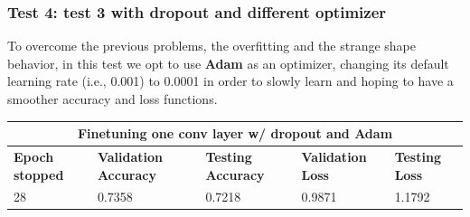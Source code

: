 \subsubsection{Test 4: test 3 with dropout and different optimizer}
To overcome the previous problems, the overfitting and the strange shape behavior, in this test we opt to use \textbf{Adam} as an optimizer, changing its default learning rate (i.e., 0.001) to 0.0001 in order to slowly learn and hoping to have a smoother accuracy and loss functions.

 
 \medskip

\begin{tabular}{ |p{2cm}|p{2cm}|p{2cm}|p{2cm}|p{2cm}|  }
\hline
\multicolumn{5}{|c|}{Finetuning one conv layer w/ dropout and Adam} \\
\hline
\textbf{Epoch stopped} & \textbf{Validation Accuracy} & \textbf{Testing Accuracy} & \textbf{Validation Loss} & \textbf{Testing Loss} \\
\hline
28 & 0.7358 & 0.7218 & 0.9871 & 1.1792\\
\hline
\end{tabular}

\medskip

